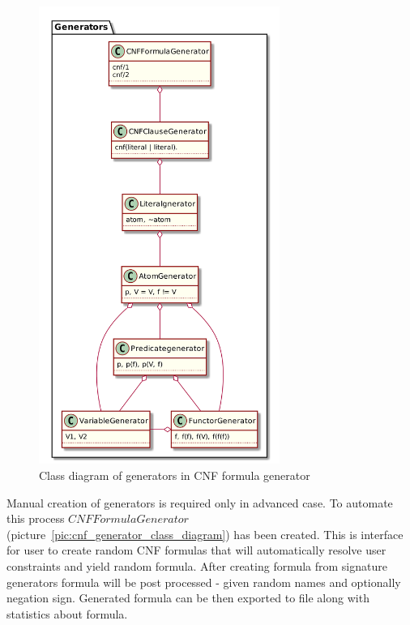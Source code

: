 \begin{figure}[h]
\begin{centering}
  \includegraphics[width=0.7\textwidth]{logic-formula-generator/fol/cnf_signature_generators.png}
  \caption{Class diagram of generators in CNF formula generator}
  \label{pic:fol_signature_generator_class_diagram}
\end{centering}
\end{figure}

Manual creation of generators is required only in advanced case. To automate this process $CNFFormulaGenerator$ (picture~\ref{pic:cnf_generator_class_diagram}) has been created. This is interface for user to create random CNF formulas that will automatically resolve user constraints and yield random formula. After creating formula from signature generators formula will be post processed - given random names and optionally negation sign. Generated formula can be then exported to file along with statistics about formula.

